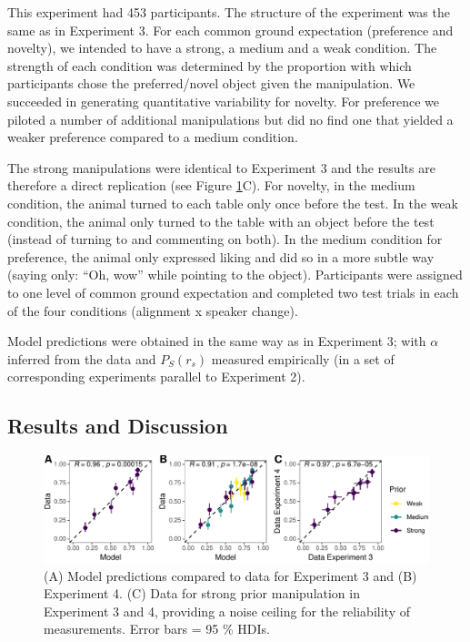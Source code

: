 \documentclass[10pt, letterpaper]{article}
\newenvironment{CodeChunk}{}{}
\begin{document}
This experiment had 453 participants. The structure of the experiment
was the same as in Experiment 3. For each common ground expectation
(preference and novelty), we intended to have a strong, a medium and a
weak condition. The strength of each condition was determined by the
proportion with which participants chose the preferred/novel object
given the manipulation. We succeeded in generating quantitative
variability for novelty. For preference we piloted a number of
additional manipulations but did no find one that yielded a weaker
preference compared to a medium condition.

The strong manipulations were identical to Experiment 3 and the results
are therefore a direct replication (see Figure
\ref{fig:plotmodelcomp}C). For novelty, in the medium condition, the
animal turned to each table only once before the test. In the weak
condition, the animal only turned to the table with an object before the
test (instead of turning to and commenting on both). In the medium
condition for preference, the animal only expressed liking and did so in
a more subtle way (saying only: ``Oh, wow'' while pointing to the
object). Participants were assigned to one level of common ground
expectation and completed two test trials in each of the four conditions
(alignment x speaker change).

Model predictions were obtained in the same way as in Experiment 3; with
\(\alpha\) inferred from the data and \(P_S(r_s)\) measured empirically
(in a set of corresponding experiments parallel to Experiment 2).

\subsection{Results and Discussion}\label{results-and-discussion-3}

\begin{CodeChunk}
\begin{figure}[h]

{\centering \includegraphics{figs/plotmodelcomp-1} 

}

\caption[(A) Model predictions compared to data for Experiment 3 and (B) Experiment 4]{(A) Model predictions compared to data for Experiment 3 and (B) Experiment 4. (C) Data for strong prior manipulation in Experiment 3 and 4, providing a noise ceiling for the reliability of measurements. Error bars = 95 \%  HDIs.}\label{fig:plotmodelcomp}
\end{figure}
\end{CodeChunk}
\end{document}
